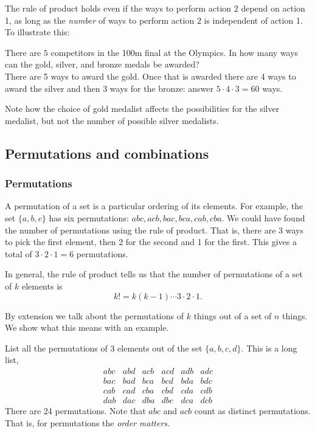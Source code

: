 The  rule of product holds even if the ways to perform action $2$ depend on action 1, as long as the {\em number} of ways to perform action $2$ 
is independent of action 1.  To illustrate this:


\medskip

\numexamp There are $5$ competitors in the 100m final at the Olympics.  In how many ways can the gold, silver, and bronze medals be awarded?\\

\ans There are 5 ways to award the gold. Once that is awarded there are 4
ways to award the silver and then 3 ways for the bronze: answer $5\cdot4\cdot3 = 60$ ways.

Note how the choice of gold medalist affects the possibilities for the silver medalist, but not the number of possible silver medalists.

\subsection{Permutations and combinations}

\subsubsection{Permutations}
A permutation of a set is a particular ordering of its elements.  For example, the set $\{a,b,c\}$ has six permutations: $abc, acb, bac, bca, cab, cba$. We could have
found the number of permutations using  the rule of product. That is,
there are 3 ways to pick the first element, then 2 for the second and 1 for 
the first. This gives a total of $3\cdot2\cdot1 = 6$ permutations.

In general, the rule of product tells us that the number of permutations of a set of $k$ elements is 
$$k! = k(k-1)\cdots 3 \cdot 2 \cdot 1.$$

By extension we talk about the permutations of $k$ things out of a set of 
$n$ things. We show what this means with an example.

\numexamp List all the permutations of 3 elements out of the set 
$\{a,b,c,d\}$.
\ans This is a long list, 
\[ \begin{array}{llllllllllllllll}
abc & abd & acb & acd & adb & adc \\
bac & bad & bca & bcd & bda & bdc \\
cab & cad & cba & cbd & cda & cdb \\
dab & dac & dba & dbc & dca & dcb
\end{array}
\]
There are 24 permutations. Note that $abc$ and $acb$ count as distinct
permutations. That is, for permutations the \emph{order matters.}

